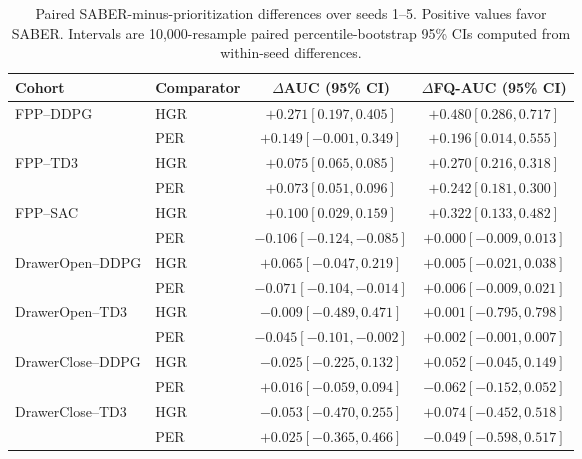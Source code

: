 \begin{table}[t]
\centering
\small
\setlength{\tabcolsep}{7pt}
\begin{tabular}{llcc}
\toprule
Cohort & Comparator & $\Delta$AUC (95\% CI) & $\Delta$FQ-AUC (95\% CI) \\
\midrule
FPP--DDPG & HGR & $+0.271 [0.197,0.405]$ & $+0.480 [0.286,0.717]$ \\
 & PER & $+0.149 [-0.001,0.349]$ & $+0.196 [0.014,0.555]$ \\
\addlinespace[1pt]
FPP--TD3 & HGR & $+0.075 [0.065,0.085]$ & $+0.270 [0.216,0.318]$ \\
 & PER & $+0.073 [0.051,0.096]$ & $+0.242 [0.181,0.300]$ \\
\addlinespace[1pt]
FPP--SAC & HGR & $+0.100 [0.029,0.159]$ & $+0.322 [0.133,0.482]$ \\
 & PER & $-0.106 [-0.124,-0.085]$ & $+0.000 [-0.009,0.013]$ \\
\addlinespace[1pt]
DrawerOpen--DDPG & HGR & $+0.065 [-0.047,0.219]$ & $+0.005 [-0.021,0.038]$ \\
 & PER & $-0.071 [-0.104,-0.014]$ & $+0.006 [-0.009,0.021]$ \\
\addlinespace[1pt]
DrawerOpen--TD3 & HGR & $-0.009 [-0.489,0.471]$ & $+0.001 [-0.795,0.798]$ \\
 & PER & $-0.045 [-0.101,-0.002]$ & $+0.002 [-0.001,0.007]$ \\
\addlinespace[1pt]
DrawerClose--DDPG & HGR & $-0.025 [-0.225,0.132]$ & $+0.052 [-0.045,0.149]$ \\
 & PER & $+0.016 [-0.059,0.094]$ & $-0.062 [-0.152,0.052]$ \\
\addlinespace[1pt]
DrawerClose--TD3 & HGR & $-0.053 [-0.470,0.255]$ & $+0.074 [-0.452,0.518]$ \\
 & PER & $+0.025 [-0.365,0.466]$ & $-0.049 [-0.598,0.517]$ \\
\bottomrule
\end{tabular}
\caption{Paired SABER-minus-prioritization differences over seeds 1--5. Positive values favor SABER. Intervals are 10,000-resample paired percentile-bootstrap 95\% CIs computed from within-seed differences.}
\label{tab:supp-prioritization-paired}
\end{table}
